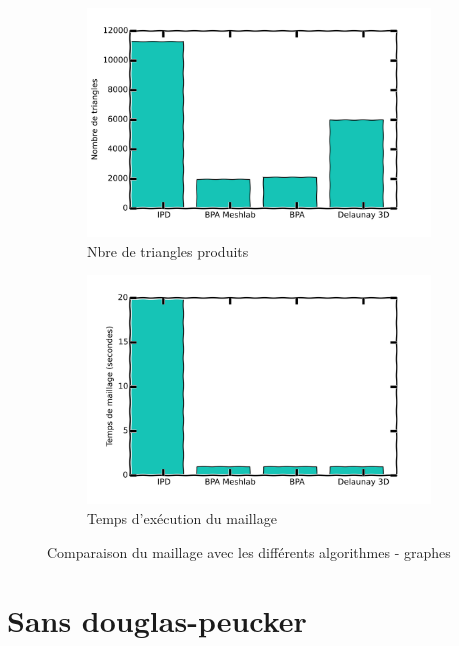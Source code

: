 \documentclass[a4paper,10pt]{report}
\begin{document}
\begin{figure}[h!]
	\centering
    \begin{subfigure}[b]{0.4\textwidth}
	    \includegraphics[width=\textwidth]{results/algos-triangles-cmp.png}
        \caption{Nbre de triangles produits}
    \end{subfigure}
    \begin{subfigure}[b]{0.4\textwidth}
	    \includegraphics[width=\textwidth]{results/algos-time-cmp.png}
        \caption{Temps d'exécution du maillage}
    \end{subfigure}
    \caption{Comparaison du maillage avec les différents algorithmes - graphes}
\end{figure}

\section{Sans douglas-peucker}
\end{document}
